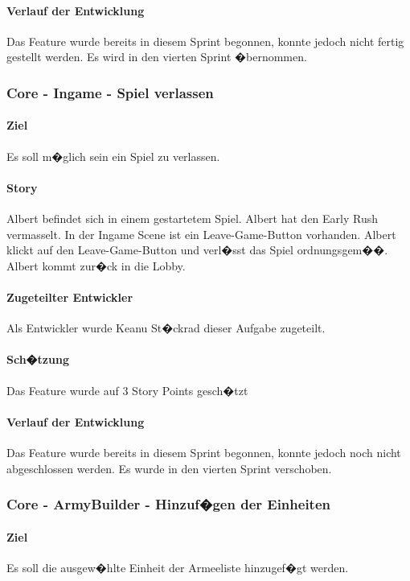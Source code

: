 \documentclass[12pt, titlepage]{scrartcl}
\begin{document}
		\paragraph{Verlauf der Entwicklung} 
		Das Feature wurde bereits in diesem Sprint begonnen, konnte jedoch nicht fertig gestellt werden. Es wird in den vierten Sprint �bernommen.
		
		\subsubsection{Core - Ingame - Spiel verlassen}
		\paragraph{Ziel} Es soll m�glich sein ein Spiel zu verlassen.
		\paragraph{Story} Albert befindet sich in einem gestartetem Spiel. Albert hat den Early Rush vermasselt. In der Ingame Scene ist ein Leave-Game-Button vorhanden. Albert klickt auf den Leave-Game-Button und verl�sst das Spiel ordnungsgem��. Albert kommt zur�ck in die Lobby.
		\paragraph{Zugeteilter Entwickler} Als Entwickler wurde Keanu St�ckrad dieser Aufgabe zugeteilt.
		\paragraph{Sch�tzung}
		Das Feature wurde auf 3 Story Points gesch�tzt
		\paragraph{Verlauf der Entwicklung} 
		Das Feature wurde bereits in diesem Sprint begonnen, konnte jedoch noch nicht abgeschlossen werden. Es wurde in den vierten Sprint verschoben.
		
		\subsubsection{Core - ArmyBuilder - Hinzuf�gen der Einheiten}
		\paragraph{Ziel} Es soll die ausgew�hlte Einheit der Armeeliste hinzugef�gt werden.
\end{document}
